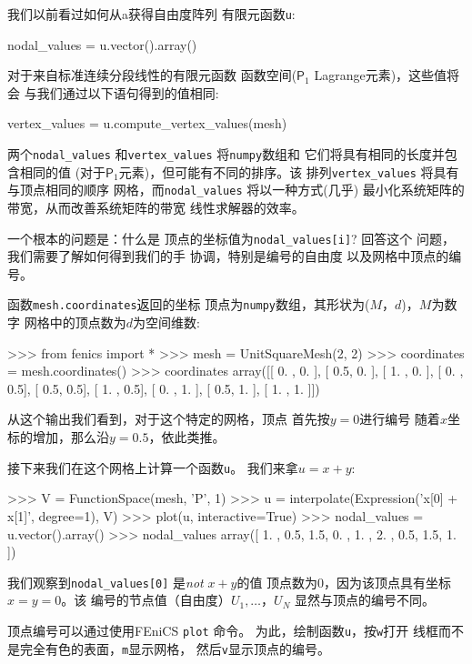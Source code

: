 我们以前看过如何从a获得自由度阵列
有限元函数\texttt{u}:

\begin{python}
nodal_values = u.vector().array()
\end{python}

对于来自标准连续分段线性的有限元函数
函数空间($\mathsf{P} _1$ Lagrange元素)，这些值将会
与我们通过以下语句得到的值相同:

\begin{python}
vertex_values = u.compute_vertex_values(mesh)
\end{python}
两个\verb!nodal_values! 和\verb!vertex_values! 将\texttt{numpy}数组和
它们将具有相同的长度并包含相同的值
(对于$\mathsf{P}_1$元素)，但可能有不同的排序。该
排列\verb!vertex_values! 将具有与顶点相同的顺序
网格，而\verb!nodal_values! 将以一种方式(几乎)
最小化系统矩阵的带宽，从而改善系统矩阵的带宽
线性求解器的效率。

一个根本的问题是：什么是
顶点的坐标值为\verb!nodal_values[i]!? 回答这个
问题，我们需要了解如何得到我们的手
协调，特别是编号的自由度
以及网格中顶点的编号。

函数\texttt{mesh.coordinates}返回的坐标
顶点为\texttt{numpy}数组，其形状为($M，d$)，$M$为数字
网格中的顶点数为$d$为空间维数:

\begin{python}
>>> from fenics import *
>>> mesh = UnitSquareMesh(2, 2)
>>> coordinates = mesh.coordinates()
>>> coordinates
array([[ 0. ,  0. ],
       [ 0.5,  0. ],
       [ 1. ,  0. ],
       [ 0. ,  0.5],
       [ 0.5,  0.5],
       [ 1. ,  0.5],
       [ 0. ,  1. ],
       [ 0.5,  1. ],
       [ 1. ,  1. ]])
\end{python}
从这个输出我们看到，对于这个特定的网格，顶点
首先按$ y=0 $进行编号
随着$x$坐标的增加，那么沿$y=0.5$，依此类推。

接下来我们在这个网格上计算一个函数\texttt{u}。 我们来拿$u=x+y$:

\begin{python}
>>> V = FunctionSpace(mesh, 'P', 1)
>>> u = interpolate(Expression('x[0] + x[1]', degree=1), V)
>>> plot(u, interactive=True)
>>> nodal_values = u.vector().array()
>>> nodal_values
array([ 1. ,  0.5,  1.5,  0. ,  1. ,  2. ,  0.5,  1.5,  1. ])
\end{python}
我们观察到\verb!nodal_values[0]! 是\emph{not} $x+y$的值
顶点数为0，因为该顶点具有坐标$x=y=0$。该
编号的节点值（自由度）$U_1,\ldots，U_{N}$
显然与顶点的编号不同。

顶点编号可以通过使用FEniCS \texttt{plot}
命令。 为此，绘制函数\texttt{u}，按\texttt{w}打开
线框而不是完全有色的表面，\texttt{m}显示网格，
然后\texttt{v}显示顶点的编号。

